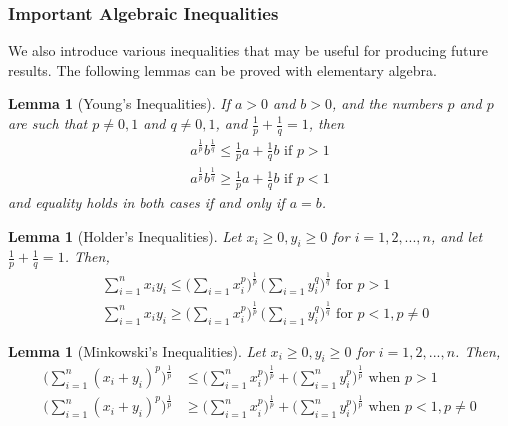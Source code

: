 \documentclass{article}
\newtheorem{lemma}[theorem]{Lemma}
\theoremstyle{remark}
\theoremstyle{definition}
\begin{document}
\subsubsection{Important Algebraic Inequalities}

We also introduce various inequalities that may be useful for producing future results. The following lemmas can be proved with elementary algebra. 

\begin{lemma}[Young's Inequalities]
If $a>0$ and $b>0$, and the numbers $p$ and $p$ are such that $p \neq 0, 1$ and $q \neq 0, 1$, and $\frac{1}{p} + \frac{1}{q} = 1$, then 
\begin{align*}
    a^{\frac{1}{p}} b^{\frac{1}{q}} \leq \frac{1}{p} a + \frac{1}{q} b \text{  if } p > 1 \\
    a^{\frac{1}{p}} b^{\frac{1}{q}} \geq \frac{1}{p} a + \frac{1}{q} b \text{  if } p < 1
\end{align*}
and equality holds in both cases if and only if $a = b$. 
\end{lemma}

\begin{lemma}[Holder's Inequalities]
Let $x_i \geq 0, y_i \geq 0$ for $i = 1, 2, ..., n$, and let $\frac{1}{p} + \frac{1}{q} = 1$. Then, 
\begin{align*}
    &\sum_{i=1}^n x_i y_i \leq \bigg( \sum_{i=1} x_i^p \bigg)^{\frac{1}{p}} \, \bigg( \sum_{i=1} y_i^q \bigg)^{\frac{1}{q}} \text{  for } p > 1 \\
    &\sum_{i=1}^n x_i y_i \geq \bigg( \sum_{i=1} x_i^p \bigg)^{\frac{1}{p}} \, \bigg( \sum_{i=1} y_i^q \bigg)^{\frac{1}{q}} \text{  for } p < 1, p \neq 0
\end{align*}
\end{lemma}

\begin{lemma}[Minkowski's Inequalities]
Let $x_i \geq 0, y_i \geq 0$ for $i = 1, 2, ... ,n$. Then, 
\begin{align*}
    \bigg( \sum_{i=1}^n (x_i + y_i)^p \bigg)^{\frac{1}{p}} & \leq \bigg( \sum_{i=1}^n x_i^p \bigg)^\frac{1}{p} + \bigg( \sum_{i=1}^n y_i^p \bigg)^{\frac{1}{p}} \text{  when } p > 1 \\
    \bigg( \sum_{i=1}^n (x_i + y_i)^p \bigg)^{\frac{1}{p}} & \geq \bigg( \sum_{i=1}^n x_i^p \bigg)^\frac{1}{p} + \bigg( \sum_{i=1}^n y_i^p \bigg)^{\frac{1}{p}} \text{  when } p < 1, p \neq 0
\end{align*}
\end{lemma}
\end{document}
